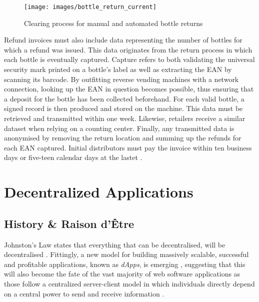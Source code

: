 \begin{figure}[hbt]
	\centering
  	\texttt{[image: images/bottle\_return\_current]}
  	\caption{Clearing process for manual and automated bottle returns \cite[p.~18]{Hartlep2011Recycling}}
  	\label{fig:clearingProcess}
\end{figure}

Refund invoices must also include data representing the number of bottles for which a refund was issued. This data originates from the return process in which each bottle is eventually captured. Capture refers to both validating the universal security mark printed on a bottle’s label as well as extracting the \ac{EAN} by scanning its barcode. By outfitting reverse vending machines with a network connection, looking up the \ac{EAN} in question becomes possible, thus ensuring that a deposit for the bottle has been collected beforehand. For each valid bottle, a signed record is then produced and stored on the machine. This data must be retrieved and transmitted within one week. Likewise, retailers receive a similar dataset when relying on a counting center. Finally, any transmitted data is anonymised by removing the return location and summing up the refunds for each \ac{EAN} captured. Initial distributors must pay the invoice within ten business days or five-teen calendar days at the lastet  \cite[p.~18-19]{Hartlep2011Recycling}.




\pagebreak

\section{Decentralized Applications}

\subsection{History \& Raison d'Être}
\label{dAppHistory}
Johnston's Law states that everything that can be decentralised, will be decentralised \cite{JohnstonsLaw}. Fittingly, a new model for building massively scalable, successful and profitable applications, known as \textit{\acp{dApp}}, is emerging \cite[p.~5]{Raval.2016} \cite[pp.~1-2]{Johnston2015}, suggesting that this will also become the fate of the vast majority of web software applications as those follow a centralized server-client model in which individuals directly depend on a central power to send and receive information \cite[pp.~7-8]{Raval.2016}. 

